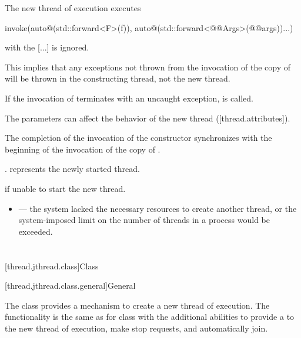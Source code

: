 \documentclass{wg21}
\begin{document}
\begin{itemdescr}
\pnum
\effects
The new thread of execution executes
\begin{codeblock}
    invoke(auto@(std::forward<F>(f)), auto@(std::forward<@@Args>(@@args))...)
\end{codeblock}
with the [...] is ignored.
\begin{note}
    This implies that any exceptions not thrown from the invocation of the copy
    of  will be thrown in the constructing thread, not the new thread.
\end{note}
If the invocation of  terminates with an uncaught exception,
 is called.

\begin{addedblock}
The parameters  can affect the behavior of the new thread ([thread.attributes]).
\end{addedblock}

\pnum
\sync
The completion of the invocation of the constructor
synchronizes with the beginning of the invocation of the copy of .

\pnum
\ensures
{}.  represents the newly started thread.

\pnum
\throws
{} if unable to start the new thread.

\pnum
\errors
\begin{itemize}
    \item {} --- the system lacked the necessary
    resources to create another thread, or the system-imposed limit on the number of
    threads in a process would be exceeded.
\end{itemize}
\end{itemdescr}

\section{}

[thread.jthread.class]{Class }

[thread.jthread.class.general]{General}

\pnum
The class  provides a mechanism
to create a new thread of execution.
The functionality is the same as for
class 
with the additional abilities to provide
a  to the new thread of execution,
make stop requests, and automatically join.
\end{document}
